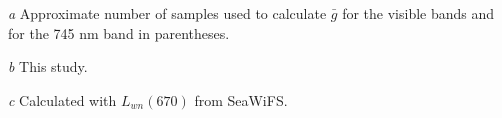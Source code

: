 \documentclass[preview]{standalone}
\begin{document}
\begin{threeparttable}
\begin{tabular}{cccccccccc}
\hline 
\end{tabular}
\begin{tablenotes}
\small
\item [\it a] Approximate number of samples used to calculate $\bar{g}$ for the visible bands and for the 745 nm band in parentheses.
\item [\it b] This study.
\item [\it c] Calculated with $L_{wn}(670)$ from SeaWiFS.
\end{tablenotes}
\end{threeparttable}
\end{document}
